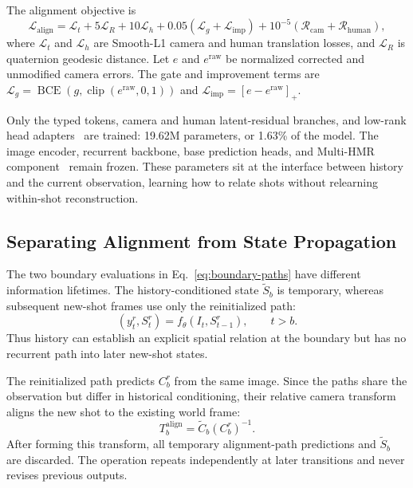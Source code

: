 \medskip
The alignment objective is
\begin{equation}
 \mathcal L_{\mathrm{align}}=\mathcal L_t+5\mathcal L_R+10\mathcal L_h
 +0.05(\mathcal L_g+\mathcal L_{\mathrm{imp}})
 +10^{-5}(\mathcal R_{\mathrm{cam}}+\mathcal R_{\mathrm{human}}),
 \label{eq:alignment-objective}
\end{equation}
where $\mathcal L_t$ and $\mathcal L_h$ are Smooth-L1 camera and human
translation losses, and $\mathcal L_R$ is quaternion geodesic distance. Let
$e$ and $e^{\mathrm{raw}}$ be normalized corrected and unmodified camera
errors. The gate and improvement terms are
$\mathcal L_g=\operatorname{BCE}(g,\operatorname{clip}(e^{\mathrm{raw}},0,1))$
and $\mathcal L_{\mathrm{imp}}=[e-e^{\mathrm{raw}}]_+$.

Only the typed tokens, camera and human latent-residual branches, and low-rank
head adapters~\citep{hu2022lora} are trained: 19.62M parameters, or 1.63\% of
the model. The image encoder, recurrent backbone, base prediction heads, and
Multi-HMR component~\citep{baradel2024multihmr} remain frozen. These parameters
sit at the interface between history and the current observation, learning how
to relate shots without relearning within-shot reconstruction.

\subsection{Separating Alignment from State Propagation}

The two boundary evaluations in Eq.~\ref{eq:boundary-paths} have different
information lifetimes. The history-conditioned state $\widetilde S_b$ is
temporary, whereas subsequent new-shot frames use only the reinitialized path:
\begin{equation}
 (y_t^r,S_t^r)=f_\theta(I_t,S_{t-1}^r),\qquad t>b.
\label{eq:dual-path}
\end{equation}
Thus history can establish an explicit spatial relation at the boundary but
has no recurrent path into later new-shot states.

The reinitialized path predicts $C_b^r$ from the same image. Since the paths
share the observation but differ in historical conditioning, their relative
camera transform aligns the new shot to the existing world frame:
\begin{equation}
 T_b^{\mathrm{align}}=\widetilde C_b(C_b^r)^{-1}.
 \label{eq:inter-shot-alignment}
\end{equation}
After forming this transform, all temporary alignment-path predictions and
$\widetilde S_b$ are discarded. The operation repeats independently at later
transitions and never revises previous outputs.

